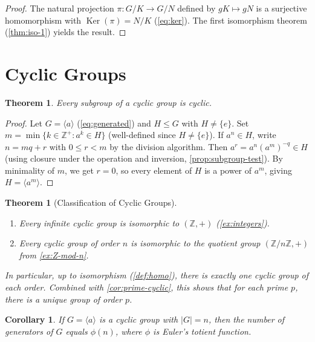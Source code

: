\documentclass[12pt,a4paper]{article}
\theoremstyle{definition}
\theoremstyle{plain}
\newtheorem{theorem}[definition]{Theorem}
\newtheorem{corollary}[definition]{Corollary}
\theoremstyle{remark}
\newcommand{\Z}{\mathbb{Z}}
\newcommand{\Ker}{\operatorname{Ker}}
\begin{document}
\begin{proof}
The natural projection $\pi \colon G/K \to G/N$ defined by $gK \mapsto gN$ is a
surjective homomorphism with $\Ker(\pi) = N/K$ (\cref{eq:ker}).
The first isomorphism theorem (\cref{thm:iso-1}) yields the result.
\end{proof}


\section{Cyclic Groups}\label{sec:cyclic}

\begin{theorem}\label{thm:cyclic-subgroup}
Every subgroup of a cyclic group is cyclic.
\end{theorem}

\begin{proof}
Let $G = \langle a \rangle$ (\cref{eq:generated}) and $H \leq G$ with $H \neq \{e\}$.
Set $m = \min\{k \in \Z^+ : a^k \in H\}$ (well-defined since $H \neq \{e\}$).
If $a^n \in H$, write $n = mq + r$ with $0 \leq r < m$ by the division algorithm.
Then $a^r = a^n(a^m)^{-q} \in H$ (using closure under the operation and inversion,
\cref{prop:subgroup-test}).
By minimality of $m$, we get $r = 0$, so every element of $H$ is a power of $a^m$,
giving $H = \langle a^m \rangle$.
\end{proof}

\begin{theorem}[Classification of Cyclic Groups]\label{thm:cyclic-classification}
\begin{enumerate}
    \item Every infinite cyclic group is isomorphic
          to $(\Z, +)$ (\cref{ex:integers}).
    \item Every cyclic group of order $n$ is isomorphic to the quotient group
          $(\Z/n\Z, +)$ from \cref{ex:Z-mod-n}.
\end{enumerate}
In particular, up to isomorphism (\cref{def:homo}), there is exactly one cyclic group
of each order. Combined with \cref{cor:prime-cyclic}, this shows that for each
prime $p$, there is a unique group of order $p$.
\end{theorem}

\begin{corollary}\label{cor:euler-phi}
If $G = \langle a \rangle$ is a cyclic group with $|G| = n$, then the
number of generators of $G$ equals $\phi(n)$, where $\phi$ is Euler's totient function.
\end{corollary}
\end{document}
